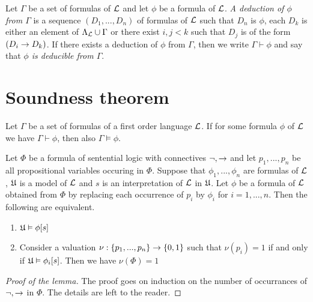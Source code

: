 \begin{definition}
Let $\Gamma$ be a set of formulas of ${\mathcal L}$ and let $\phi$ be a formula of ${\mathcal L}$. \textit{A deduction of $\phi$ from $\Gamma$} is a sequence $(D_1 , ..., D_n)$ of formulas of ${\mathcal L}$ such that $D_n$ is $\phi$, each $D_k$ is either an element of $\Lambda_{\mathcal L} \cup \Gamma$ or there exist $i, j < k$ such that $D_j$ is of the form $(D_i \rightarrow D_k)$. If there exists a deduction of $\phi$ from $\Gamma$, then we write $\Gamma \vdash \phi$ and say that \textit{$\phi$ is deducible from $\Gamma$}.
\end{definition}

\section{Soundness theorem}

\begin{theorem}\label{theorem:soundness_theorem}
Let $\Gamma$ be a set of formulas of a first order language ${\mathcal L}$. If for some formula $\phi$ of ${\mathcal L}$ we have $\Gamma \vdash \phi$, then also $\Gamma \vDash \phi$.
\end{theorem}

\begin{lemma}\label{lemma:classical_sentential_logic_holds_in_models}
Let $\Phi$ be a formula of sentential logic with connectives $\neg, \rightarrow$ and let $p_1,...,p_n$ be all propositional variables occuring in $\Phi$. Suppose that $\phi_1,...,\phi_n$ are formulas of ${\mathcal L}$, ${\mathfrak U}$ is a model of ${\mathcal L}$ and $s$ is an interpretation of ${\mathcal L}$ in ${\mathfrak U}$. Let $\phi$ be a formula of ${\mathcal L}$ obtained from $\Phi$ by replacing each occurrence of $p_i$ by $\phi_i$ for $i = 1, ..., n$. Then the following are equivalent.
\begin{enumerate}[label=\textbf{\emph{(\roman*)}}, leftmargin=3.0em]
\item ${\mathfrak U} \vDash \phi[s]$
\item Consider a valuation $\nu:\{p_1,...,p_n\} \rightarrow \{0, 1\}$ such that $\nu(p_i) = 1$ if and only if ${\mathfrak U} \vDash \phi_i[s]$. Then we have $\nu(\Phi) = 1$
\end{enumerate}
\end{lemma}
\begin{proof}[Proof of the lemma]
The proof goes on induction on the number of occurrances of $\neg, \rightarrow$ in $\Phi$. The details are left to the reader.
\end{proof}

